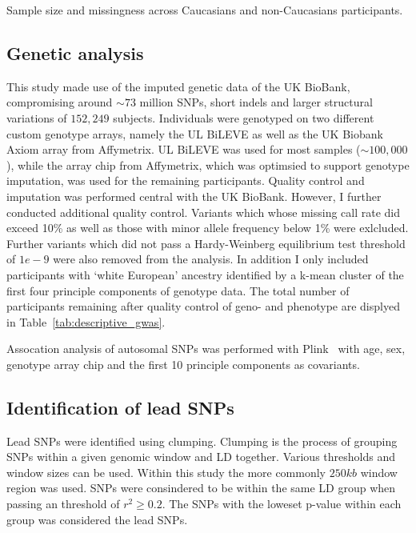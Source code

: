 \begin{table}[!htpb]
	\centering
	\resizebox{\textwidth}{!}{}
  \caption{Sample size and missingness across Caucasians and non-Caucasians participants.
}\label{tab:descriptive_gwas} 
\end{table}

\subsection{Genetic analysis}
\label{sub:genetic_analysis}
This study made use of the imputed genetic data of the UK BioBank, compromising around $\sim73$ million SNPs, short indels and larger structural variations of $152,249$ subjects.
Individuals were genotyped on two different custom genotype arrays, namely the UL BiLEVE as well as the UK Biobank Axiom array from Affymetrix. 
UL BiLEVE was used for most samples ($\sim100,000$), while the array chip from Affymetrix, which was optimsied to support genotype imputation, was used for the remaining participants. 
Quality control and imputation was performed central with the UK BioBank.
However, I further conducted additional quality control.
Variants which whose missing call rate did exceed 10\% as well as those with minor allele frequency below 1\% were exlcluded.
Further variants which did not pass a Hardy-Weinberg equilibrium test threshold of $1e-9$ were also removed from the analysis.
In addition I only included participants with `white European' ancestry identified by a k-mean cluster of the first four principle components of genotype data.
The total number of participants remaining after quality control of geno- and phenotype are displyed in Table~\ref{tab:descriptive_gwas}.

Assocation analysis of autosomal SNPs was performed with Plink~\cite{Purcell2007,Chang2015} with age, sex, genotype array chip and the first 10 principle components as covariants.

\subsection{Identification of lead SNPs}
\label{sub:Clumping}

Lead SNPs were identified using clumping.
Clumping is the process of grouping SNPs within a given genomic window and LD together.
Various thresholds and window sizes can be used.
Within this study the more commonly $250kb$ window region was used.
SNPs were consindered to be within the same LD group when passing an threshold of $r^2 \ge 0.2$.
The SNPs with the loweset p-value within each group was considered the lead SNPs.

